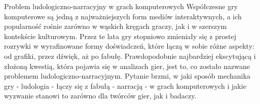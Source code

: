\begin{frame}{Problem ludologiczno-narracyjny w grach komputerowych}
Współczesne gry komputerowe są jedną z najważniejszych form mediów interaktywnych, a ich popularność rośnie zarówno w wąskich kręgach graczy, jak i w szerszym kontekście kulturowym. Przez te lata gry stopniowo zmieniały się z prostej rozrywki w wyrafinowane formy doświadczeń, które łączą w sobie różne aspekty: od grafiki, przez dźwięk, aż po fabułę. Prawdopodobnie najbardziej ekscytującą i złożoną kwestią, która pojawia się w analizach gier, jest to, co zostało nazwane problemem ludologiczno-narracyjnym. Pytanie brzmi, w jaki sposób mechanika gry - ludologia - łączy się z fabułą - narracją - w grach komputerowych i jakie wyzwanie stanowi to zarówno dla twórców gier, jak i badaczy.
\end{frame}
